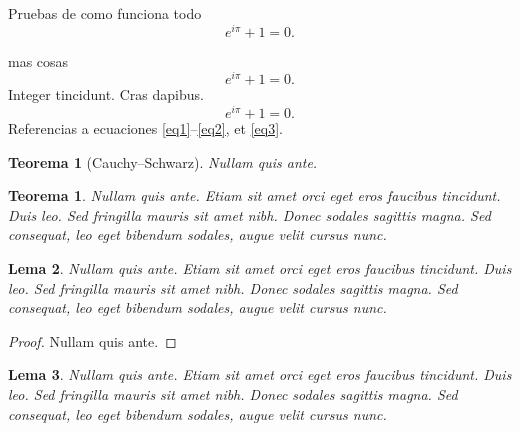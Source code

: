 \documentclass[a4paper,11pt,spanish, twoside, leqno]{tfg-uam}
\newtheorem{teor}{Teorema}[chapter]
\newtheorem{lema}[teor]{Lema}
\newtheorem*{teorsin}{Teorema}
\theoremstyle{definition}
\begin{document}
Pruebas de como funciona todo
\begin{equation}\label{eq1}
e^{i\pi }+1=0.
\end{equation}

mas cosas
\begin{equation}\label{eq2}
e^{i\pi }+1=0.
\end{equation}
Integer tincidunt. Cras dapibus.
\begin{equation}\label{eq3}
e^{i\pi }+1=0.
\end{equation}
Referencias a ecuaciones \eqref{eq1}--\eqref{eq2}, et \eqref{eq3}. 




\begin{teorsin}
[Cauchy--Schwarz]Nullam quis ante. 
\end{teorsin}


\begin{teor}\label{teor1}
Nullam quis ante. Etiam sit amet orci eget eros faucibus tincidunt. Duis leo. Sed fringilla mauris sit amet nibh. Donec sodales sagittis magna. Sed consequat, leo eget bibendum sodales, augue velit cursus nunc.
\end{teor}



\begin{lema}\label{lema1}
Nullam quis ante. Etiam sit amet orci eget eros faucibus tincidunt. Duis leo. Sed fringilla mauris sit amet nibh. Donec sodales sagittis magna. Sed consequat, leo eget bibendum sodales, augue velit cursus nunc.
\end{lema}

\begin{proof}
Nullam quis ante. 
\end{proof}


\begin{lema}\label{lema2}
Nullam quis ante. Etiam sit amet orci eget eros faucibus tincidunt. Duis leo. Sed fringilla mauris sit amet nibh. Donec sodales sagittis magna. Sed consequat, leo eget bibendum sodales, augue velit cursus nunc.
\end{lema}
\end{document}
